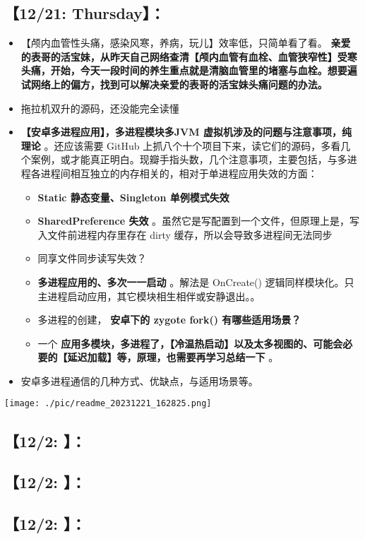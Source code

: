 \documentclass[9pt, b5paper]{article}
\begin{document}
\subsection{【12/21: Thursday】：}
\label{sec-2-4}
\begin{itemize}
\item 【颅内血管性头痛，感染风寒，养病，玩儿】效率低，只简单看了看。 \textbf{亲爱的表哥的活宝妹，从昨天自己网络查清【颅内血管有血栓、血管狭窄性】受寒头痛，开始，今天一段时间的养生重点就是清脑血管里的堵塞与血栓。想要遍试网络上的偏方，找到可以解决亲爱的表哥的活宝妹头痛问题的办法。}
\item 拖拉机双升的源码，还没能完全读懂
\item \textbf{【安卓多进程应用】，多进程模块多JVM 虚拟机涉及的问题与注意事项，纯理论} 。还应该需要 GitHub 上抓八个十个项目下来，读它们的源码，多看几个案例，或才能真正明白。现瓣手指头数，几个注意事项，主要包括，与多进程各进程间相互独立的内存相关的，相对于单进程应用失效的方面：
\begin{itemize}
\item \textbf{Static 静态变量、Singleton 单例模式失效}
\item \textbf{SharedPreference 失效} 。虽然它是写配置到一个文件，但原理上是，写入文件前进程内存里存在 dirty 缓存，所以会导致多进程间无法同步
\item 同享文件同步读写失效？
\item \textbf{多进程应用的、多次一一启动} 。解法是 OnCreate() 逻辑同样模块化。只主进程启动应用，其它模块相生相伴或安静退出。。
\item 多进程的创建， \textbf{安卓下的 zygote fork() 有哪些适用场景？}
\item 一个 \textbf{应用多模块，多进程了，【冷温热启动】以及太多视图的、可能会必要的【延迟加载】等，原理，也需要再学习总结一下} 。
\end{itemize}
\item 安卓多进程通信的几种方式、优缺点，与适用场景等。
\end{itemize}

\texttt{[image: ./pic/readme\_20231221\_162825.png]}
\subsection{【12/2: 】：}
\label{sec-2-5}
\subsection{【12/2: 】：}
\label{sec-2-6}
\subsection{【12/2: 】：}
\label{sec-2-7}
\end{document}
